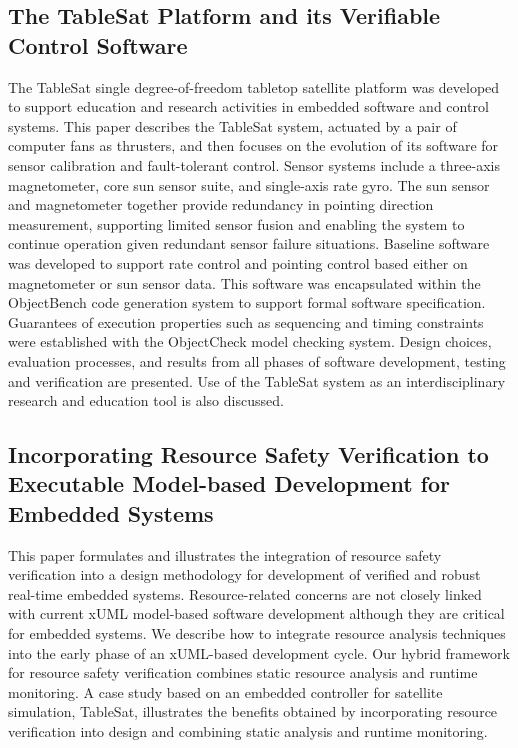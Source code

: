 \subsection{The TableSat Platform and its Verifiable Control Software}

The TableSat single degree-of-freedom tabletop satellite platform was developed to support
education and research activities in embedded software and control systems. This paper describes
the TableSat system, actuated by a pair of computer fans as thrusters, and then focuses on the
evolution of its software for sensor calibration and fault-tolerant control. Sensor systems include a
three-axis magnetometer, core sun sensor suite, and single-axis rate gyro. The sun sensor and
magnetometer together provide redundancy in pointing direction measurement, supporting limited
sensor fusion and enabling the system to continue operation given redundant sensor failure
situations. Baseline software was developed to support rate control and pointing control based
either on magnetometer or sun sensor data. This software was encapsulated within the ObjectBench
code generation system to support formal software specification. Guarantees of execution properties
such as sequencing and timing constraints were established with the ObjectCheck model checking
system. Design choices, evaluation processes, and results from all phases of software development,
testing and verification are presented. Use of the TableSat system as an interdisciplinary research
and education tool is also discussed.


\subsection{Incorporating Resource Safety Verification to Executable Model-based
Development for Embedded Systems}

This paper formulates and illustrates the integration of
resource safety verification into a design methodology for
development of verified and robust real-time embedded
systems. Resource-related concerns are not closely linked
with current xUML model-based software development
although they are critical for embedded systems. We
describe how to integrate resource analysis techniques
into the early phase of an xUML-based development cycle.
Our hybrid framework for resource safety verification
combines static resource analysis and runtime monitoring.
A case study based on an embedded controller for
satellite simulation, TableSat, illustrates the benefits
obtained by incorporating resource verification into
design and combining static analysis and runtime
monitoring.

